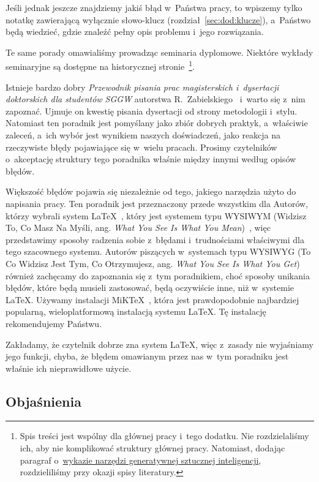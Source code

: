 Jeśli jednak jeszcze znajdziemy jakiś błąd w~Państwa pracy, to wpiszemy tylko notatkę zawierającą wyłącznie słowo-klucz (rozdział~\ref{sec:dod:klucze}), a~Państwo będą wiedzieć, gdzie znaleźć pełny opis problemu i~jego rozwiązania.

Te same porady omawialiśmy prowadząc seminaria dyplomowe. Niektóre wykłady seminaryjne są dostępne na historycznej stronie~\footnote{Spis treści jest wspólny dla głównej pracy i~tego dodatku. Nie rozdzielaliśmy ich, aby nie komplikować struktury głównej pracy. Natomiast, dodając paragraf o~\hyperref[sec:dod:bibliografia-SI]{wykazie narzędzi generatywnej sztucznej inteligencji}, rozdzieliliśmy przy okazji spisy literatury.}.

Istnieje bardzo dobry {\em Przewodnik pisania prac magisterskich i~dysertacji doktorskich dla studentów SGGW} autorstwa R.~Zabielskiego~\cite[Przewodnik pisania\dots,]{dyplomowanie-uczelnia} i~warto się z~nim zapoznać. Ujmuje on kwestię pisania dysertacji od strony metodologii i~stylu. Natomiast ten poradnik jest pomyślany jako zbiór dobrych praktyk, a~właściwie zaleceń, a~ich wybór jest wynikiem naszych doświadczeń, jako reakcja na rzeczywiste błędy pojawiające się w~wielu pracach. Prosimy czytelników o~akceptację struktury tego poradnika właśnie między innymi według opisów błędów.

Większość błędów pojawia się niezależnie od tego, jakiego narzędzia użyto do napisania pracy. Ten poradnik jest przeznaczony przede wszystkim dla Autorów, którzy wybrali system \LaTeX~, który jest systemem typu WYSIWYM (Widzisz To, Co Masz Na Myśli, ang. {\em What You See Is What You Mean})~, więc przedstawimy sposoby radzenia sobie z~błędami i~trudnościami właściwymi dla tego szacownego systemu. Autorów piszących w~systemach typu WYSIWYG (To Co Widzisz Jest Tym, Co Otrzymujesz, ang. {\em What You See Is What You Get})~ również zachęcamy do zapoznania się z~tym poradnikiem, choć sposoby unikania błędów, które będą musieli zastosować, będą oczywiście inne, niż w~systemie \LaTeX. Używamy instalacji MiK\TeX{}~, która jest prawdopodobnie najbardziej popularną, wieloplatformową instalacją systemu \LaTeX. Tę instalację rekomendujemy Państwu.

Zakładamy, że czytelnik dobrze zna system \LaTeX{}, więc z~zasady nie wyjaśniamy jego funkcji, chyba, że błędem omawianym przez nas w~tym poradniku jest właśnie ich nieprawidłowe użycie.


\subsection{Objaśnienia}
